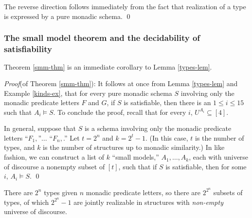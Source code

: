 The reverse direction follows immediately from the fact that realization of a type is expressed by a pure monadic schema. \qed


\subsubsection*{The small model theorem and the decidability of satisfiability}

Theorem \ref{smm-thm} is an immediate corollary to Lemma \ref{types-lem}.

\emph{Proof}(of Theorem \ref{smm-thm}): %
It follows at once from Lemma \ref{types-lem} and Example \ref{kinds-ex}, that for every pure monadic schema $S$ involving only the monadic predicate letters $F$ and $G$, if $S$ is satisfiable, then there is an $1\leq i\leq 15$ such that $A_i\models S$. To conclude the proof, recall that for every $i$, $U^{A_i}\subseteq[4]$. 
\iffalse
\begin{aside}
    Why? Because there are only $15$ canonical models. There are $2^4$ subsets of types (since we have $2^2 = 4$ types), but only 15 of those are realizable (since for any nonempty model, at least one type must be realized). For $i \in [15]$, we let each $C_i$ realize different types; since there are only 15 possible realized types, it follows that every structure has some $C_i$ as its homomorphic image. These $C_i$ are our canonical models. 
\end{aside}
\fi
In general, suppose that $S$ is a schema involving only the monadic predicate letters
``$F_1,$''$\ldots$ ``$F_n,$.'' Let $t=2^n$ and $k = 2^t -1$. (In this case, $t$ is the number of types, and $k$ is the number of structures up to monadic similarity.) In like fashion, we can construct a list of $k$ ``small models,'' $A_1,\ldots, A_k$, each with universe of discourse a nonempty subset of $[t]$, such that if $S$ is satisfiable, then for some $i$, $A_i\models S$. 
\qed
\iffalse
\begin{aside}
    There are $2^n$ types given $n$ monadic predicate letters, so there are $2^{2^n}$ subsets of types, of which $2^{2^n} - 1$ are jointly realizable in structures with \emph{non-empty} universe of discourse.  
\end{aside}

